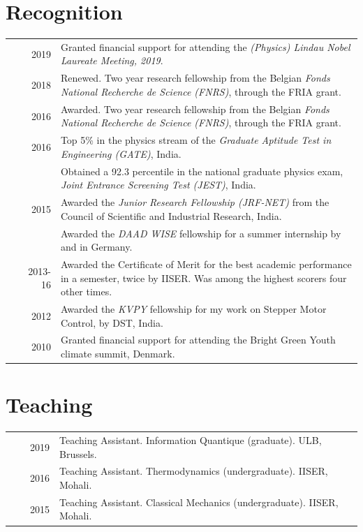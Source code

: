 \documentclass[a4paper,10pt]{article}
\begin{document}
\section{Recognition }
\begin{tabular}{rrp{11cm}}
  & ~~2019 & Granted financial support for attending the \emph{(Physics) Lindau Nobel Laureate Meeting, 2019}. \\
  & ~~2018 & Renewed. Two year research fellowship from the Belgian \emph{Fonds National Recherche de Science (FNRS)}, through the FRIA grant.\normalsize\\
  & ~~2016 & Awarded. Two year research fellowship from the Belgian \emph{Fonds National Recherche de Science (FNRS)}, through the FRIA grant.\normalsize\\
 & ~~2016     & Top 5\% in the physics stream of the \emph{Graduate Aptitude Test in Engineering (GATE)}, India. \\
 & ~~~~~~     & Obtained a 92.3 percentile in the national graduate physics exam, \emph{Joint Entrance Screening Test (JEST)}, India. \\

 & ~~2015     & Awarded the \emph{Junior Research Fellowship (JRF-NET)} from the Council of Scientific and Industrial Research, India. \\
 & ~~~~~~     & Awarded the \emph{DAAD WISE} fellowship for a summer internship by and in Germany.\\
 & 2013-16  & Awarded the Certificate of Merit for the best academic performance in a semester, twice by IISER. Was among the highest scorers four other times.\\
 & ~~2012     & Awarded the \emph{KVPY} fellowship for my work on Stepper Motor Control, by DST, India.\\
 & ~~2010     & Granted financial support for attending the Bright Green Youth climate summit, Denmark.
\end{tabular}


  \section{Teaching}
  \begin{tabular}{rrp{11cm}}
  & ~~2019 &Teaching Assistant. Information Quantique (graduate). ULB, Brussels.\\  
  & ~~2016 &Teaching Assistant. Thermodynamics (undergraduate). IISER, Mohali.\\
  & ~~2015 &Teaching Assistant. Classical Mechanics (undergraduate). IISER, Mohali.
  \end{tabular}
  
\end{document}
